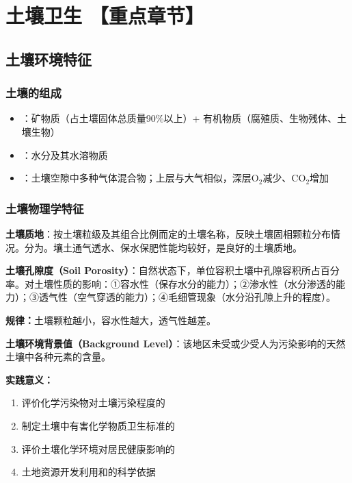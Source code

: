 \chapter{土壤卫生  【重点章节】}
\setcounter{chapter}{7}

\section{土壤环境特征}

\subsection{土壤的组成}
\begin{itemize}[leftmargin=*]
    \item {}：矿物质（占土壤固体总质量90\%以上）+ 有机物质（腐殖质、生物残体、土壤生物）
    \item {}：水分及其水溶物质
    \item {}：土壤空隙中多种气体混合物；上层与大气相似，深层O$_2$减少、CO$_2$增加
\end{itemize}

\subsection{土壤物理学特征}

\begin{defbox}
\textbf{土壤质地}：按土壤粒级及其组合比例而定的土壤名称，反映土壤固相颗粒分布情况。分为。壤土通气透水、保水保肥性能均较好，是良好的土壤质地。

\textbf{土壤孔隙度（Soil Porosity）}：自然状态下，单位容积土壤中孔隙容积所占百分率。对土壤性质的影响：①容水性（保存水分的能力）；②渗水性（水分渗透的能力）；③透气性（空气穿透的能力）；④毛细管现象（水分沿孔隙上升的程度）。

\textbf{规律：}土壤颗粒越小，容水性越大，透气性越差。
\end{defbox}

\begin{keybox}
\textbf{土壤环境背景值（Background Level）}：该地区未受或少受人为污染影响的天然土壤中各种元素的含量。

\textbf{实践意义：}
\begin{enumerate}[leftmargin=*]
    \item 评价化学污染物对土壤污染程度的
    \item 制定土壤中有害化学物质卫生标准的
    \item 评价土壤化学环境对居民健康影响的
    \item 土地资源开发利用和的科学依据
\end{enumerate}
\end{keybox}

